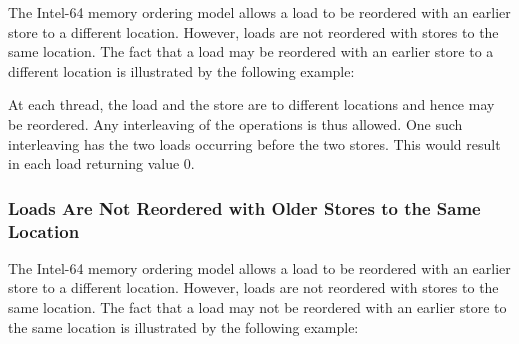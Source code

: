 The Intel-64 memory ordering model allows a load to be reordered with an earlier store to a different location.
However, loads are not reordered with stores to the same location.
\bigbreak
\noindent
The fact that a load may be reordered with an earlier store to a different location is illustrated by the following example:

\begin{table}[!hbt]
\noindent{}
\caption[Loads May be Reordered with Older Stores]{Loads May be Reordered with Older Stores \cite[Example 8-3]{ref:Intel}}
\label{tbl:litmus:intel:3}
\end{table}

\noindent
At each thread, the load and the store are to different locations and hence may be reordered.
Any interleaving of the operations is thus allowed.
One such interleaving has the two loads occurring before the two stores.
This would result in each load returning value 0.

\newpage

\subsubsection*{Loads Are Not Reordered with Older Stores to the Same Location}

The Intel-64 memory ordering model allows a load to be reordered with an earlier store to a different location.
However, loads are not reordered with stores to the same location.
\bigbreak
\noindent
The fact that a load may not be reordered with an earlier store to the same location is illustrated by the following
example:

